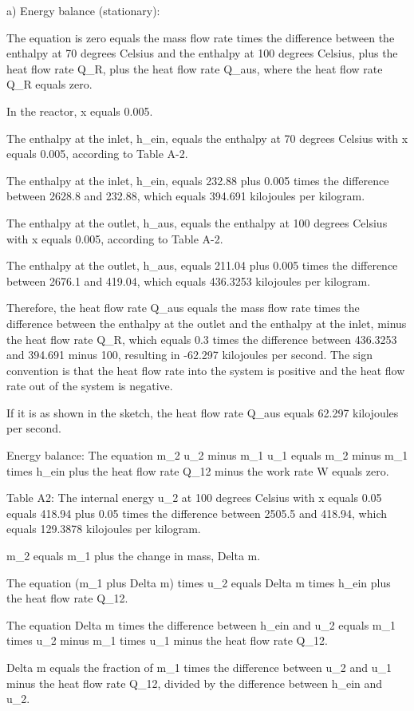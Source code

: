 a) Energy balance (stationary):

The equation is zero equals the mass flow rate times the difference between the enthalpy at 70 degrees Celsius and the enthalpy at 100 degrees Celsius, plus the heat flow rate Q_R, plus the heat flow rate Q_aus, where the heat flow rate Q_R equals zero.

In the reactor, x equals 0.005.

The enthalpy at the inlet, h_ein, equals the enthalpy at 70 degrees Celsius with x equals 0.005, according to Table A-2.

The enthalpy at the inlet, h_ein, equals 232.88 plus 0.005 times the difference between 2628.8 and 232.88, which equals 394.691 kilojoules per kilogram.

The enthalpy at the outlet, h_aus, equals the enthalpy at 100 degrees Celsius with x equals 0.005, according to Table A-2.

The enthalpy at the outlet, h_aus, equals 211.04 plus 0.005 times the difference between 2676.1 and 419.04, which equals 436.3253 kilojoules per kilogram.

Therefore, the heat flow rate Q_aus equals the mass flow rate times the difference between the enthalpy at the outlet and the enthalpy at the inlet, minus the heat flow rate Q_R, which equals 0.3 times the difference between 436.3253 and 394.691 minus 100, resulting in -62.297 kilojoules per second. The sign convention is that the heat flow rate into the system is positive and the heat flow rate out of the system is negative.

If it is as shown in the sketch, the heat flow rate Q_aus equals 62.297 kilojoules per second.

Energy balance:
The equation m_2 u_2 minus m_1 u_1 equals m_2 minus m_1 times h_ein plus the heat flow rate Q_12 minus the work rate W equals zero.

Table A2:
The internal energy u_2 at 100 degrees Celsius with x equals 0.05 equals 418.94 plus 0.05 times the difference between 2505.5 and 418.94, which equals 129.3878 kilojoules per kilogram.

m_2 equals m_1 plus the change in mass, Delta m.

The equation (m_1 plus Delta m) times u_2 equals Delta m times h_ein plus the heat flow rate Q_12.

The equation Delta m times the difference between h_ein and u_2 equals m_1 times u_2 minus m_1 times u_1 minus the heat flow rate Q_12.

Delta m equals the fraction of m_1 times the difference between u_2 and u_1 minus the heat flow rate Q_12, divided by the difference between h_ein and u_2.